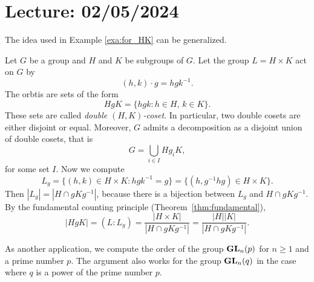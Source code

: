 \section{Lecture: 02/05/2024}


The idea used in Example \ref{exa:for_HK} can be generalized. 

\begin{example}
Let $G$ be a group and $H$ and $K$ be subgroups of $G$. Let the group $L=H\times K$ act on $G$ by
\[
(h,k)\cdot g=hgk^{-1}.
\]
The orbtis are sets of the form 
\[
HgK=\{hgk:h\in H,\,k\in K\}.
\]
These sets are called \emph{double $(H,K)$-coset}. 
In particular, two double cosets are either disjoint 
or equal. Moreover, $G$ admits a decomposition 
as a disjoint union of double cosets, that is 
\[
G=\bigcup_{i\in I}Hg_iK,
\]
for some set $I$. Now we compute 
\[
L_g=\{(h,k)\in H\times K:hgk^{-1}=g\}=\{(h,g^{-1}hg)\in H\times K\}.
\]
Then $|L_g|=|H\cap gKg^{-1}|$, because there is a bijection between $L_g$ and
$H\cap gKg^{-1}$. By the fundamental counting principle (Theorem~\ref{thm:fundamental}), 
\[
|HgK|=(L:L_g)=\frac{|H\times K|}{|H\cap gKg^{-1}|}=\frac{|H||K|}{|H\cap gKg^{-1}|}.
\]
\end{example}

As another application, we compute the
order of the group $\mathbf{GL}_n(p)$ for $n\geq1$ and 
a prime number $p$. 
The argument also works for
the group $\mathbf{GL}_n(q)$ in the case where
$q$ is a power of the prime number $p$.

